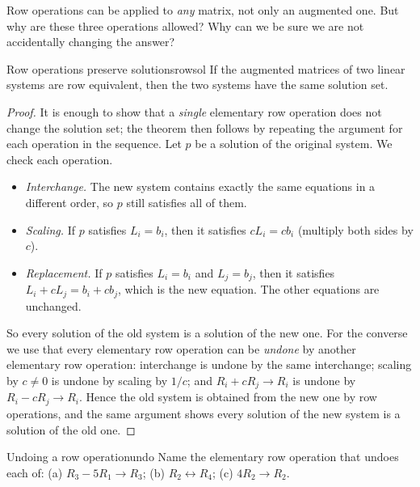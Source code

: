 \documentclass[11pt]{article}
\begin{document}
Row operations can be applied to \emph{any} matrix, not only an augmented one. But why are
these three operations allowed? Why can we be sure we are not accidentally changing the answer?
 
\begin{thm}{Row operations preserve solutions}{rowsol}
If the augmented matrices of two linear systems are row equivalent, then the two systems have the
same solution set.
\end{thm}
 
\begin{proof}
It is enough to show that a \emph{single} elementary row operation does not change the solution
set; the theorem then follows by repeating the argument for each operation in the sequence.
Let $p$ be a solution of the original system. We check each operation.
\begin{itemize}
  \item \emph{Interchange.} The new system contains exactly the same equations in a different
        order, so $p$ still satisfies all of them.
  \item \emph{Scaling.} If $p$ satisfies $L_i=b_i$, then it satisfies $cL_i=cb_i$ (multiply
        both sides by $c$).
  \item \emph{Replacement.} If $p$ satisfies $L_i=b_i$ and $L_j=b_j$, then it satisfies
        $L_i+cL_j=b_i+cb_j$, which is the new equation. The other equations are unchanged.
\end{itemize}
So every solution of the old system is a solution of the new one. For the converse we use that
every elementary row operation can be \emph{undone} by another elementary row operation:
interchange is undone by the same interchange; scaling by $c\neq0$ is undone by scaling by $1/c$;
and $R_i+cR_j\to R_i$ is undone by $R_i-cR_j\to R_i$. Hence the old system is obtained from
the new one by row operations, and the same argument shows every solution of the new system
is a solution of the old one.
\end{proof}
 
\begin{kc}{Undoing a row operation}{undo}
Name the elementary row operation that undoes each of: (a) $R_3-5R_1\to R_3$;
(b) $R_2\leftrightarrow R_4$; (c) $4R_2\to R_2$.
\end{kc}
 
\end{document}
